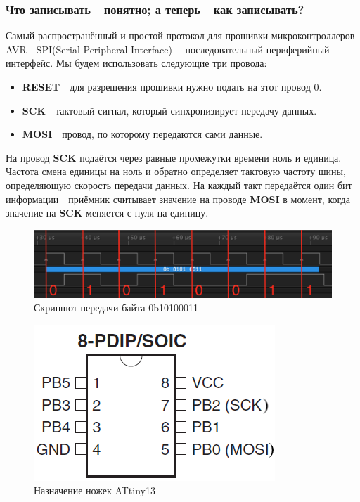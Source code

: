 \documentclass[aspectratio=169, pdf, 8pt, unicode]{beamer}
\begin{document}
\begin{frame}[fragile]
\frametitle{Что записывать\ \cyrdash\ понятно; а теперь\ \cyrdash\ как записывать?}
	Самый распространённый и простой протокол для прошивки микроконтроллеров AVR\ \cyrdash\ SPI(Serial Peripheral Interface)\ \cyrdash
	\ последовательный периферийный интерфейс. Мы будем использовать следующие три провода:
	\begin{itemize}
		\item \textbf{RESET}\ \cyrdash\ для разрешения прошивки нужно подать на этот провод 0.
		\item \textbf{SCK}\ \cyrdash\ тактовый сигнал, который синхронизирует передачу данных.
		\item \textbf{MOSI}\ \cyrdash\ провод, по которому передаются сами данные.
	\end{itemize}
	На провод \textbf{SCK} подаётся через равные промежутки времени ноль и единица. Частота смена единицы на ноль и обратно определяет
	тактовую частоту шины, определяющую скорость передачи данных. На каждый такт передаётся один бит информации\ \cyrdash\ приёмник
	считывает значение на проводе \textbf{MOSI} в момент, когда значение на \textbf{SCK} меняется с нуля на единицу.
	\begin{minipage}{0.79\textwidth}
		\vspace*{0.3cm}
		\begin{figure}[H]
			\centering
			\includegraphics[width=\textwidth]{resources/spi_example.png}
			\caption{Скриншот передачи байта 0b10100011}
		\end{figure}
	\end{minipage}
	\begin{minipage}{0.20\textwidth}
		\vspace*{0.3cm}
		\begin{figure}[H]
			\centering
			\includegraphics[width=\textwidth]{resources/attiny13_pinout.PNG}
			\caption{Назначение ножек ATtiny13}
		\end{figure}
	\end{minipage}
\end{frame}
\end{document}
